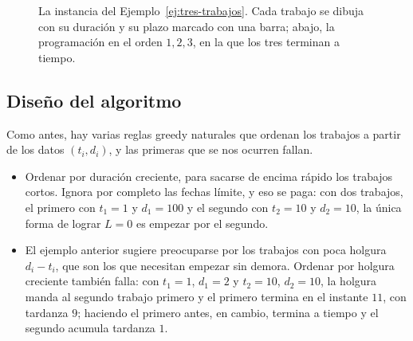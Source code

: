 \documentclass[12pt, spanish, oneside, openany]{book}
\theoremstyle{uprightplain}
\theoremstyle{definition}
\theoremstyle{remark}
\theoremstyle{definition}
\begin{document}
\begin{figure}[H]
\centering
{}
\caption{La instancia del Ejemplo~\ref{ej:tres-trabajos}. Cada trabajo se
dibuja con su duración y su plazo marcado con una barra; abajo, la
programación en el orden $1,2,3$, en la que los tres terminan a tiempo.}
\label{fig:instancia-retraso}
\end{figure}

\subsection{Diseño del algoritmo}

Como antes, hay varias reglas greedy naturales que ordenan los trabajos a partir de los datos $(t_i,d_i)$, y las primeras que se nos ocurren fallan.

\begin{itemize}
    \item Ordenar por duración creciente, para sacarse de encima rápido los trabajos cortos. Ignora por completo las fechas límite, y eso se paga: con dos trabajos, el primero con $t_1=1$ y $d_1=100$ y el segundo con $t_2=10$ y $d_2=10$, la única forma de lograr $L=0$ es empezar por el segundo.

    \item El ejemplo anterior sugiere preocuparse por los trabajos con poca holgura $d_i-t_i$, que son los que necesitan empezar sin demora. Ordenar por holgura creciente también falla: con $t_1=1$, $d_1=2$ y $t_2=10$, $d_2=10$, la holgura manda al segundo trabajo primero y el primero termina en el instante $11$, con tardanza $9$; haciendo el primero antes, en cambio, termina a tiempo y el segundo acumula tardanza $1$.
\end{itemize}
\end{document}
